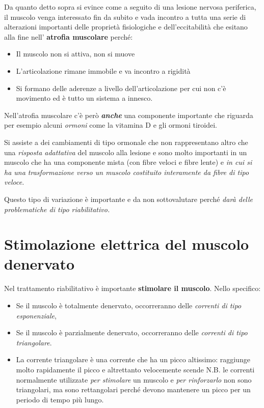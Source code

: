 Da quanto detto sopra si evince come a seguito di una lesione nervosa
periferica, il muscolo venga interessato fin da subito e vada incontro a
tutta una serie di alterazioni importanti delle proprietà fisiologiche e
dell'eccitabilità che esitano alla fine nell' \textbf{atrofia muscolare}
perché:

\begin{itemize}
\item
  Il muscolo non si attiva, non si muove
\item
  L'articolazione rimane immobile e va incontro a rigidità
\item
  Si formano delle aderenze a livello dell'articolazione per cui non c'è
  movimento ed è tutto un sistema a innesco.
\end{itemize}

Nell'atrofia muscolare c'è però \textbf{\emph{anche}} una componente
importante che riguarda per esempio alcuni \emph{ormoni} come la
vitamina D e gli ormoni tiroidei.

Si assiste a dei cambiamenti di tipo ormonale che non rappresentano
altro che una \emph{risposta adattativa} del muscolo alla lesione e sono
molto importanti in un muscolo che ha una componente mista (con fibre
veloci e fibre lente) e \emph{in cui si ha una trasformazione verso un
muscolo costituito interamente da fibre di tipo veloce. }

Questo tipo di variazione è importante e da non sottovalutare perché
\emph{darà delle problematiche di tipo riabilitativo.}

\section{Stimolazione elettrica del muscolo denervato}

Nel trattamento riabilitativo è importante \textbf{stimolare il
muscolo}. Nello specifico:

\begin{itemize}
\item
  Se il muscolo è totalmente denervato, occorreranno delle
  \emph{correnti di tipo esponenziale},
\item
  Se il muscolo è parzialmente denervato, occorreranno delle
  \emph{correnti di tipo triangolare}.
\item
  La corrente triangolare è una corrente che ha un picco altissimo:
  raggiunge molto rapidamente il picco e altrettanto velocemente scende
N.B. le correnti normalmente utilizzate \emph{per stimolare} un muscolo
e \emph{per rinforzarlo} non sono triangolari, ma sono rettangolari
perché devono mantenere un picco per un periodo di tempo più lungo.
\end{itemize}

